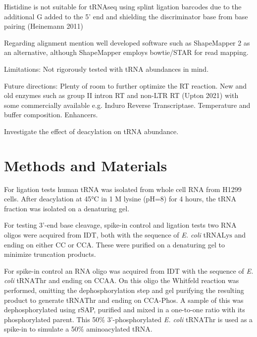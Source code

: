 \documentclass[9pt,lineno]{elife}
\begin{document}
Histidine is not suitable for tRNAseq using splint ligation barcodes due to the additional G added to the 5' end and shielding the discriminator base from base pairing (Heinemann 2011)


Regarding alignment mention well developed software such as ShapeMapper 2 as an alternative, although ShapeMapper employs bowtie/STAR for read mapping.



Limitations:
Not rigorously tested with tRNA abundances in mind.



Future directions:
Plenty of room to further optimize the RT reaction.
New and old enzymes such as group II intron RT and non-LTR RT (Upton 2021) with some commercially available e.g. Induro Reverse Transcriptase.
Temperature and buffer composition.
Enhancers.


Investigate the effect of deacylation on tRNA abundance.











\section{Methods and Materials}


For ligation tests human tRNA was isolated from whole cell RNA from H1299 cells.
After deacylation at 45°C in 1 M lysine (pH=8) for 4 hours, the tRNA fraction was isolated on a denaturing gel.

For testing 3'-end base cleavage, spike-in control and ligation tests two RNA oligos were acquired from IDT, both with the sequence of \textit{E. coli} tRNA$\text{Lys}$ and ending on either CC or CCA.
These were purified on a denaturing gel to minimize truncation products.

For spike-in control an RNA oligo was acquired from IDT with the sequence of \textit{E. coli} tRNA$\text{Thr}$ and ending on CCAA.
On this oligo the Whitfeld reaction was performed, omitting the dephosphorylation step and gel purifying the resulting product to generate tRNA$\text{Thr}$ and ending on CCA-Phos.
A sample of this was dephosphorylated using rSAP, purified and mixed in a one-to-one ratio with its phosphorylated parent.
This 50\% 3'-phosphorylated \textit{E. coli} tRNA$\text{Thr}$ is used as a spike-in to simulate a 50\% aminoacylated tRNA.
\end{document}
